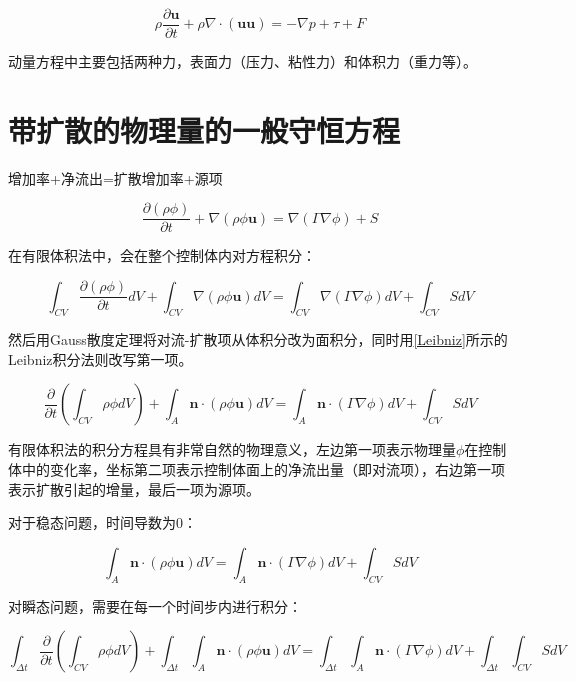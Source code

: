 \begin{equation}
\rho \frac{\partial \bm{u}}{\partial t} + \rho\nabla\cdot(\bm{uu}) = -\nabla p + \tau + F
\end{equation}

动量方程中主要包括两种力，表面力（压力、粘性力）和体积力（重力等）。

\section{带扩散的物理量的一般守恒方程}

增加率+净流出=扩散增加率+源项

\begin{equation}
\frac{\partial (\rho\phi)}{\partial t} + \nabla(\rho\phi\bm{u}) = \nabla(\Gamma\nabla\phi) + S
\end{equation}

在有限体积法中，会在整个控制体内对方程积分：

\begin{equation}
\int_{CV}\frac{\partial (\rho\phi)}{\partial t}dV + \int_{CV}\nabla(\rho\phi\bm{u})dV = \int_{CV}\nabla(\Gamma\nabla\phi)dV + \int_{CV}SdV
\end{equation}

然后用Gauss散度定理将对流-扩散项从体积分改为面积分，同时用\autoref{Leibniz}所示的Leibniz积分法则改写第一项。

\begin{equation}
\frac{\partial}{\partial t}\left(\int_{CV}\rho\phi dV\right) + \int_{A}\bm{n}\cdot(\rho\phi\bm{u})dV = \int_{A}\bm{n}\cdot(\Gamma\nabla\phi)dV + \int_{CV}SdV
\end{equation}

有限体积法的积分方程具有非常自然的物理意义，左边第一项表示物理量$ \phi $在控制体中的变化率，坐标第二项表示控制体面上的净流出量（即对流项），右边第一项表示扩散引起的增量，最后一项为源项。

对于稳态问题，时间导数为0：

\begin{equation}
\int_{A}\bm{n}\cdot(\rho\phi\bm{u})dV = \int_{A}\bm{n}\cdot(\Gamma\nabla\phi)dV + \int_{CV}SdV
\end{equation}

对瞬态问题，需要在每一个时间步内进行积分：

\begin{equation}
\int_{\Delta t}\frac{\partial}{\partial t}\left(\int_{CV}\rho\phi dV\right) + \int_{\Delta t}\int_{A}\bm{n}\cdot(\rho\phi\bm{u})dV = \int_{\Delta t}\int_{A}\bm{n}\cdot(\Gamma\nabla\phi)dV + \int_{\Delta t}\int_{CV}SdV
\end{equation}

